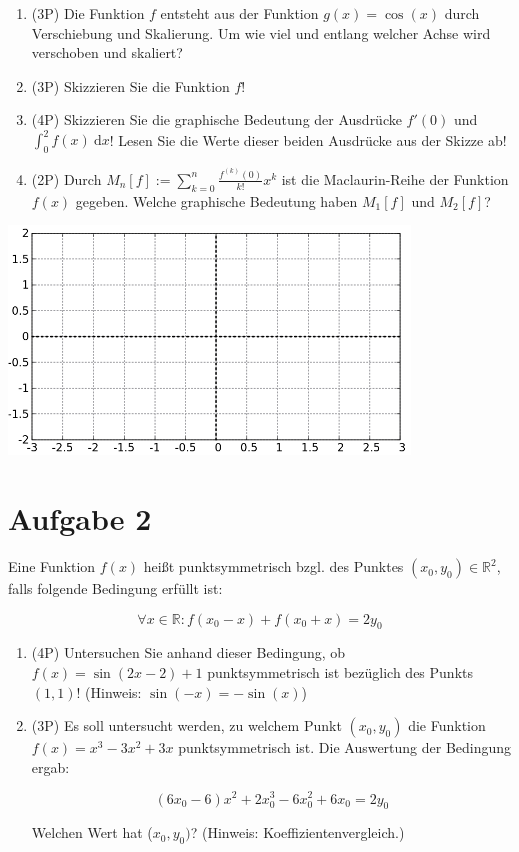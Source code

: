 \documentclass[12pt]{article}
\providecommand\d{}
\renewcommand{\d}[1]{\:\mathrm{d}{#1}}
\begin{document}
\begin{enumerate}[label=(\alph*)]
\item (3P) Die Funktion $f$ entsteht aus der Funktion $g(x) = \cos(x)$ durch Verschiebung und Skalierung. Um wie viel und entlang welcher Achse wird verschoben und skaliert?
\item (3P) Skizzieren Sie die Funktion $f$!
\item (4P) Skizzieren Sie die graphische Bedeutung der Ausdrücke $f'(0)$ und $\int_0^2 f(x)\d x$! Lesen Sie die Werte dieser beiden Ausdrücke aus der Skizze ab!
\item (2P) Durch $M_{n}[f] := \sum\limits_{k=0}^n \frac{f^{(k)}(0)}{k!}x^k$ ist die Maclaurin-Reihe der Funktion $f(x)$ gegeben. Welche graphische Bedeutung haben $M_1[f]$ und $M_2[f]$?
\end {enumerate}

\begin{center}
\includegraphics[width=0.8\textwidth]{grid_klausur.png}
\end{center}

\newpage
\section* {Aufgabe 2}

Eine Funktion $f(x)$ heißt punktsymmetrisch bzgl. des Punktes $(x_0,y_0) \in\mathbb{R}^2$, falls folgende Bedingung erfüllt ist:

$$\forall x \in \mathbb{R}: f(x_0-x)+f(x_0+x)=2y_0$$ 

\begin{enumerate}[label=(\alph*)]

\item (4P) Untersuchen Sie anhand dieser Bedingung, ob $f(x) = \sin(2x-2)+1$ punktsymmetrisch ist bezüglich des Punkts $(1,1)$! (Hinweis: $\sin(-x)=-\sin(x)$)

\item  (3P) Es soll untersucht werden, zu welchem Punkt $(x_0,y_0)$ die Funktion \\
$f(x) = x^3-3x^2+3x$ punktsymmetrisch ist. Die Auswertung der Bedingung ergab:

$$(6x_0-6) x^2 + 2x_0^3 - 6x_0^2 + 6x_0 = 2y_0$$

Welchen Wert hat ($x_0,y_0)$? (Hinweis: Koeffizientenvergleich.)

\end{enumerate}
\end{document}
